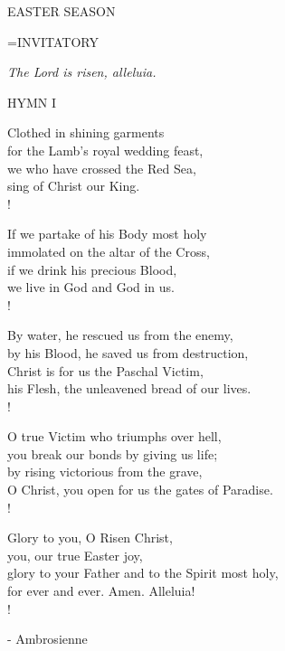 \begin{center}\normalsize EASTER SEASON\\
\end{center}

\hangindent=\parindent \small{INVITATORY}
\begin{center}
\textit{The Lord is risen, alleluia.\\}
\end{center}

\noindent\small{\uppercase{Hymn I}}\normalsize\label{easter:firstHymn}
\begin{cverse}
Clothed in shining garments\\
for the Lamb's royal wedding feast,\\
we who have crossed the Red Sea,\\
sing of Christ our King.\\!

If we partake of his Body most holy\\
immolated on the altar of the Cross,\\
if we drink his precious Blood,\\
we live in God and God in us.\\!

By water, he rescued us from the enemy,\\
by his Blood, he saved us from destruction,\\
Christ is for us the Paschal Victim,\\
his Flesh, the unleavened bread of our lives.\\!

O true Victim who triumphs over hell,\\
you break our bonds by giving us life;\\
by rising victorious from the grave,\\
O Christ, you open for us the gates of Paradise.\\!

Glory to you, O Risen Christ,\\
you, our true Easter joy,\\
glory to your Father and to the Spirit most holy,\\
for ever and ever. Amen. Alleluia!\\!
\end{cverse}
\begin{flushright}\tiny - Ambrosienne\end{flushright}

